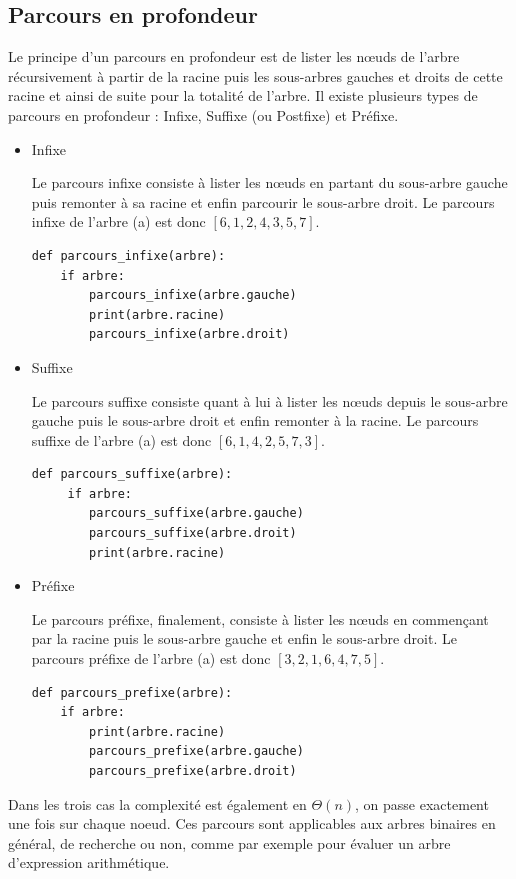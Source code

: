 \documentclass{report}
\begin{document}
\subsection{Parcours en profondeur}
Le principe d'un parcours en profondeur est de lister les nœuds de l'arbre récursivement à partir de la racine puis les sous-arbres gauches et droits de cette racine et ainsi de suite pour la totalité de l'arbre.
Il existe plusieurs types de parcours en profondeur : Infixe, Suffixe (ou Postfixe) et Préfixe.
\begin{itemize}
\item Infixe

Le parcours infixe consiste à lister les nœuds en partant du sous-arbre gauche puis remonter à sa racine et enfin parcourir le sous-arbre droit.
Le parcours infixe de l'arbre (a) est donc $[6, 1, 2, 4, 3, 5, 7]$.
\begin{lstlisting}
def parcours_infixe(arbre): 
    if arbre: 
        parcours_infixe(arbre.gauche) 
        print(arbre.racine)
        parcours_infixe(arbre.droit) 
\end{lstlisting}

\item Suffixe \label{suffixe}

Le parcours suffixe consiste quant à lui à lister les nœuds depuis le sous-arbre gauche puis le sous-arbre droit et enfin remonter à la racine.
Le parcours suffixe de l'arbre (a) est donc $[6, 1, 4, 2, 5, 7, 3]$.
\begin{lstlisting}
def parcours_suffixe(arbre): 
     if arbre: 
        parcours_suffixe(arbre.gauche) 
        parcours_suffixe(arbre.droit) 
        print(arbre.racine)
\end{lstlisting}

\item Préfixe

Le parcours préfixe, finalement, consiste à lister les nœuds en commençant par la racine puis le sous-arbre gauche et enfin le sous-arbre droit.
Le parcours préfixe de l'arbre (a) est donc $[3, 2, 1, 6, 4, 7, 5]$.
\begin{lstlisting}
def parcours_prefixe(arbre):
    if arbre:
        print(arbre.racine)
        parcours_prefixe(arbre.gauche)
        parcours_prefixe(arbre.droit)
\end{lstlisting}

\end{itemize}

Dans les trois cas la complexité est également en $\Theta(n)$, on passe exactement une fois sur chaque noeud. Ces parcours sont applicables aux arbres binaires en général, de recherche ou non, comme par exemple pour évaluer un arbre d'expression arithmétique.
\end{document}

